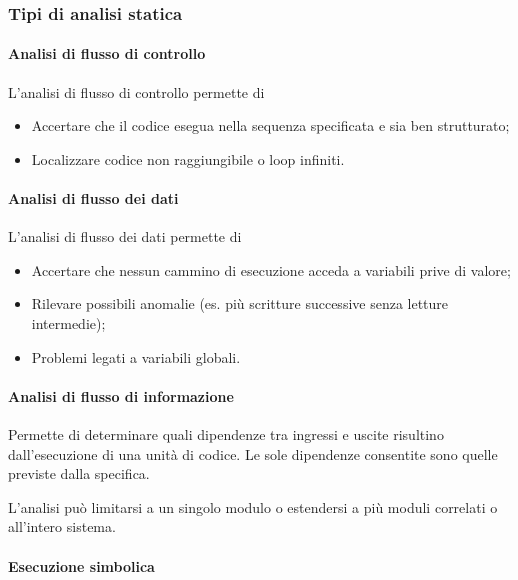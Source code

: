 \subsubsection{Tipi di analisi statica}
\label{ssub:tipi_di_analisi_statica}

\paragraph{Analisi di flusso di controllo}
\label{par:analisi_di_flusso_di_controllo}

L'analisi di flusso di controllo permette di

\begin{itemize}
  \item Accertare che il codice esegua nella sequenza specificata e sia ben
  strutturato;
  \item Localizzare codice non raggiungibile o loop infiniti.
\end{itemize}

\paragraph{Analisi di flusso dei dati}
\label{par:analisi_di_flusso_dei_dati}

L'analisi di flusso dei dati permette di

\begin{itemize}
  \item Accertare che nessun cammino di esecuzione acceda a variabili prive di
  valore;
  \item Rilevare possibili anomalie (es. più scritture successive senza letture
  intermedie);
  \item Problemi legati a variabili globali.
\end{itemize}

\paragraph{Analisi di flusso di informazione}
\label{par:analisi_di_flusso_di_informazione}

Permette di determinare quali dipendenze tra ingressi e uscite risultino
dall'esecuzione di una unità di codice. Le sole dipendenze consentite sono
quelle previste dalla specifica.

L'analisi può limitarsi a un singolo modulo o estendersi a più moduli correlati
o all'intero sistema.

\paragraph{Esecuzione simbolica}
\label{par:esecuzione_simbolica}

